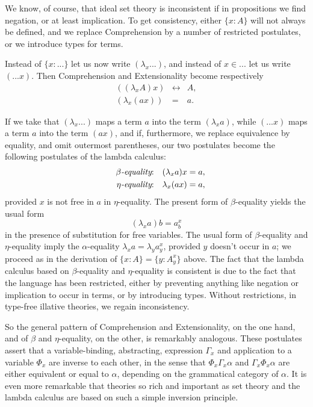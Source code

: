 We know, of course, that ideal set theory is inconsistent if in propositions
we find negation, or at least implication. To get consistency, either $%
\{x:A\}$ will not always be defined, and we replace Comprehension by a
number of restricted postulates, or we introduce types for terms.

Instead of $\{x:...\}$ let us now write $(\lambda _{x}...)$, and instead of $%
x\in ...$ let us write $(...x)$. Then Comprehension and Extensionality
become respectively 
\begin{eqnarray*}
((\lambda _{x}A)x) &\leftrightarrow &A, \\
(\lambda _{x}(ax)) &=&a.
\end{eqnarray*}

If we take that $(\lambda _{x}...)$ maps a term $a$ into the term $(\lambda
_{x}a)$, while $(...x)$ maps a term $a$ into the term $(ax)$, and if,
furthermore, we replace equivalence by equality, and omit outermost
parentheses, our two postulates become the following postulates of the
lambda calculus: 
\begin{eqnarray*}
&&\beta \text{{\it -equality}:\quad }(\lambda _{x}a)x=a, \\
&&\eta \text{{\it -equality}:\quad }\lambda _{x}(ax)=a,
\end{eqnarray*}
provided $x$ is not free in $a$ in $\eta $-equality. The present form of $%
\beta $-equality yields the usual form 
\[
(\lambda _{x}a)b=a_{b}^{x} 
\]
in the presence of substitution for free variables. The usual form of $\beta 
$-equality and $\eta $-equality imply the $\alpha $-equality $\lambda
_{x}a=\lambda _{y}a_{y}^{x}$, provided $y$ doesn't occur in $a$; we proceed
as in the derivation of $\{x:A\}=\{y:A_{y}^{x}\}$ above. The fact that the
lambda calculus based on $\beta $-equality and $\eta $-equality is
consistent is due to the fact that the language has been restricted, either
by preventing anything like negation or implication to occur in terms, or by
introducing types. Without restrictions, in type-free illative theories, we
regain inconsistency.

So the general pattern of Comprehension and Extensionality, on the one hand,
and of $\beta $ and $\eta $-equality, on the other, is remarkably analogous.
These postulates assert that a variable-binding, abstracting, expression $%
\Gamma _{x}$ and application to a variable $\Phi _{x}$ are inverse to each
other, in the sense that $\Phi _{x}\Gamma _{x}\alpha $ and $\Gamma _{x}\Phi
_{x}\alpha $ are either equivalent or equal to $\alpha $, depending on the
grammatical category of $\alpha $. It is even more remarkable that theories
so rich and important as set theory and the lambda calculus are based on
such a simple inversion principle.


